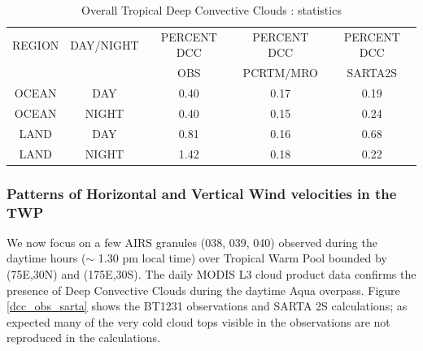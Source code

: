 \documentclass[agupp]{aguplus}              %
\begin{document}
\begin{article}
\begin{center}
\begin{table}[ht]
{\small
\hfill{}
\begin{tabular}{ccccc} %
\hline\hline %
  REGION    & DAY/NIGHT &  PERCENT DCC & PERCENT DCC & PERCENT DCC \\
            &           &     OBS      & PCRTM/MRO   & SARTA2S \\
\hline
OCEAN & DAY    &  0.40  &  0.17 &  0.19 \\
OCEAN & NIGHT  &  0.40  &  0.15 &  0.24 \\
LAND & DAY     &  0.81  &  0.16 &  0.68 \\
LAND & NIGHT   &  1.42  &  0.18 &  0.22 \\
\hline
\end{tabular}}
\hfill{}
\caption{Overall Tropical Deep Convective Clouds : statistics }
\label{table:dcc_stats} %
\end{table}
\end{center}



\subsubsection{Patterns of Horizontal and Vertical Wind velocities in the TWP}

We now focus on a few AIRS granules (038, 039, 040) observed during
the daytime hours ($\sim$ 1.30 pm local time) over Tropical Warm Pool
bounded by (75E,30N) and (175E,30S). The daily MODIS L3 cloud product
data confirms the presence of Deep Convective Clouds during the
daytime Aqua overpass.  Figure \ref{dcc_obs_sarta} shows the BT1231
observations and SARTA 2S calculations; as expected many of the very
cold cloud tops visible in the observations are not reproduced in the
calculations.


\end{article}
\end{document}
